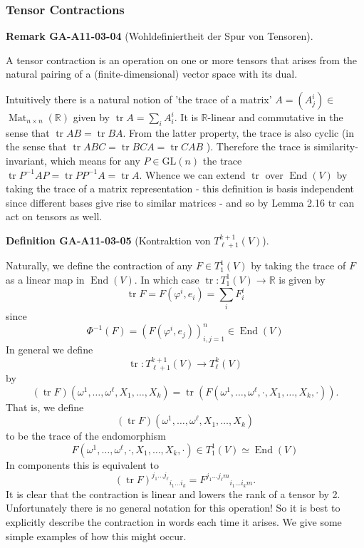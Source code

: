 \documentclass[10pt, letterpaper]{article}
\newcommand{\CustomHeading}[3]{%
  \par\medskip\noindent%
  \textbf{#1 #2} \textnormal{(#3)}.\enskip%
}
\newenvironment{DEF}[2]{\begin{unitbox}\CustomHeading{Definition}{#1}{#2}}{\end{unitbox}}
\newenvironment{REM}[2]{\begin{unitbox}\CustomHeading{Remark}{#1}{#2}}{\end{unitbox}}
\begin{document}
\subsubsection*{Tensor Contractions}


\begin{REM}{GA-A11-03-04}{Wohldefiniertheit der Spur von Tensoren}
A tensor contraction is an operation on one or more tensors that arises from the natural pairing of a (finite-dimensional) vector space with its dual.

Intuitively there is a natural notion of 'the trace of a matrix' $A=\left(A_{j}^{i}\right) \in$ $\operatorname{Mat}_{n \times n}(\mathbb{R})$ given by $\operatorname{tr} A=\sum_{i} A_{i}^{i}$. It is $\mathbb{R}$-linear and commutative in the sense that $\operatorname{tr} A B=\operatorname{tr} B A$. From the latter property, the trace is also cyclic (in the sense that $\operatorname{tr} A B C=\operatorname{tr} B C A=\operatorname{tr} C A B$ ). Therefore the trace is similarity-invariant, which means for any $P \in \mathrm{GL}(n)$ the trace $\operatorname{tr} P^{-1} A P=\operatorname{tr} P P^{-1} A=\operatorname{tr} A$. Whence we can extend $\operatorname{tr}$ over $\operatorname{End}(V)$ by taking the trace of a matrix representation - this definition is basis independent since different bases give rise to similar matrices - and so by Lemma 2.16 tr can act on tensors as well.
\end{REM}


\begin{DEF}{GA-A11-03-05}{Kontraktion von $T_{\ell+1}^{k+1}(V)$}
Naturally, we define the contraction of any $F \in T_{1}^{1}(V)$ by taking the trace of $F$ as a linear map in $\operatorname{End}(V)$. In which case $\operatorname{tr}: T_{1}^{1}(V) \rightarrow \mathbb{R}$ is given by 
$$\operatorname{tr} F=F\left(\varphi^{i}, e_{i}\right)=\sum_{i} F_{i}^{i}$$ 
since 
$$\Phi^{-1}(F)=\left(F\left(\varphi^{i}, e_{j}\right)\right)_{i, j=1}^{n} \in \operatorname{End}(V)$$ 
In general we define
$$
\operatorname{tr}: T_{\ell+1}^{k+1}(V) \rightarrow T_{\ell}^{k}(V)
$$
by
$$
(\operatorname{tr} F)\left(\omega^{1}, \ldots, \omega^{\ell}, X_{1}, \ldots, X_{k}\right)=\operatorname{tr}\left(F\left(\omega^{1}, \ldots, \omega^{\ell}, \cdot, X_{1}, \ldots, X_{k}, \cdot\right)\right) .
$$
That is, we define 
$$(\operatorname{tr} F)\left(\omega^{1}, \ldots, \omega^{\ell}, X_{1}, \ldots, X_{k}\right)$$ 
to be the trace of the endomorphism 
$$F\left(\omega^{1}, \ldots, \omega^{\ell}, \cdot, X_{1}, \ldots, X_{k}, \cdot\right) \in T_{1}^{1}(V) \simeq \operatorname{End}(V)$$ 
In components this is equivalent to
$$
(\operatorname{tr} F)^{j_{1} \ldots j_{\ell}}{ }_{i_{1} \ldots i_{k}}=F^{j_{1} \ldots j_{\ell} m}{ }_{i_{1} \ldots i_{k} m} .
$$
It is clear that the contraction is linear and lowers the rank of a tensor by 2. Unfortunately there is no general notation for this operation! So it is best to explicitly describe the contraction in words each time it arises. We give some simple examples of how this might occur.
\end{DEF}
\end{document}
